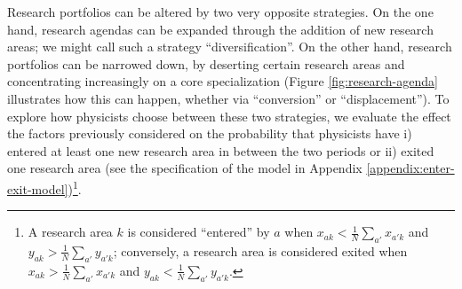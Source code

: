 \documentclass{article}
\begin{document}
Research portfolios can be altered by two very opposite strategies. On the one hand, research agendas can be expanded through the addition of new research areas; we might call such a strategy ``diversification''. On the other hand, research portfolios can be narrowed down, by deserting certain research areas and concentrating increasingly on a core specialization (Figure \ref{fig:research-agenda} illustrates how this can happen, whether via ``conversion'' or ``displacement''). To explore how physicists choose between these two strategies, we evaluate the effect the factors previously considered on the probability that physicists have i) entered at least one new research area in between the two periods or ii) exited one research area (see the specification of the model in Appendix \ref{appendix:enter-exit-model})\footnote{A research area $k$ is considered ``entered'' by $a$ when $x_{ak}<\frac{1}{N}\sum_{a'}x_{a'k}$ and $y_{ak}>\frac{1}{N}\sum_{a'}y_{a'k}$; conversely, a research area is considered exited when $x_{ak}>\frac{1}{N}\sum_{a'}x_{a'k}$ and $y_{ak}<\frac{1}{N}\sum_{a'}y_{a'k}$.}.
\end{document}
